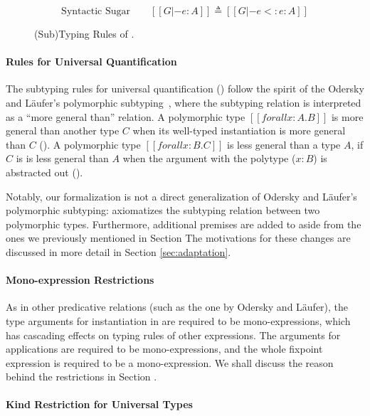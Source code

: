 \begin{figure}
    \begin{equation*}
       \text{Syntactic Sugar} \qquad [[G |- e : A]] \triangleq [[G |- e <: e : A]]
    \end{equation*}
    \caption{(Sub)Typing Rules of \name.}
    \label{fig:typing}
\end{figure}

\paragraph{Rules for Universal Quantification}
The subtyping rules for universal quantification () follow
the spirit of the Odersky and L\"aufer's polymorphic subtyping~\cite{odersky1996putting,DunfieldJoshua2013Caeb},
where the subtyping relation is interpreted as a ``more general than'' relation.
A polymorphic type $[[forall x : A. B]]$
is more general than another type $C$ when its well-typed
instantiation is more general than $C$ (). A polymorphic
type $[[forall x : B. C]]$ is less general than a type $A$,
if $C$ is is less general than $A$ when the argument with the polytype ($x:B$)
is abstracted out ().

Notably, our formalization is not a direct generalization of Odersky and L\"aufer's
polymorphic subtyping:
 axiomatizes the subtyping relation between two polymorphic types.
Furthermore, additional premises are added to  aside from the
ones we previously mentioned in Section \label{sec:polymorphic-subtyping}
The motivations for these changes are discussed in more detail in Section \ref{sec:adaptation}.

\paragraph{Mono-expression Restrictions}
As in other predicative relations (such as the one by Odersky and L\"aufer),
the type arguments for instantiation in  are
required to be mono-expressions, which has cascading effects on typing rules of
other expressions. The arguments for applications are required to be
mono-expressions, and the whole fixpoint expression is required to be a
mono-expression. We shall
discuss the reason behind the restrictions in Section \label{sec:metatheory}.

\paragraph{Kind Restriction for Universal Types}
\label{sec:kind-restriction}

